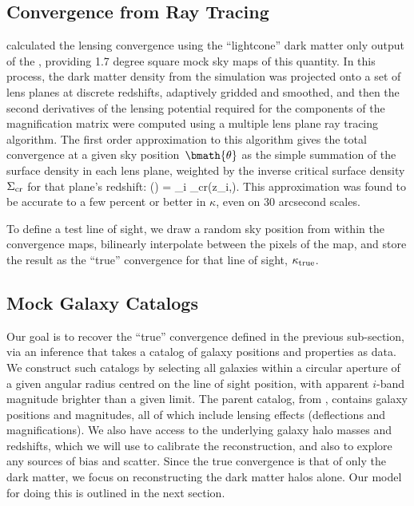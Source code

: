 \documentclass[useAMS,usenatbib]{mn2e}
\begin{document}
\subsection{Convergence from Ray Tracing}
\label{sec:MS:raytracing}

\citet{HilbertEtal2009} calculated the lensing convergence using the
``lightcone'' dark matter only 
output of the \MS, providing 1.7 degree square 
mock sky maps of this
quantity. In this process, the dark matter density from the simulation
was projected onto a set of lens planes at discrete redshifts,
adaptively gridded and smoothed, and then the second derivatives of the 
lensing potential required for the components of the magnification
matrix were computed using a multiple lens plane ray tracing algorithm.
The first order approximation to this algorithm \citep[equation 17
of][]{HilbertEtal2009} gives the total convergence at a given sky
position~$\bmath{\theta}$ as the simple summation of the surface density
in each lens plane, weighted by the inverse critical surface density
$\Sigma_{\rm cr}$ for that plane's redshift:
\be
\kappa(\bmath{\theta}) = \sum_i 
                                     {\Sigma_{\rm cr}(z_i,\zs)}.
\ee
This approximation was found to be accurate to a few percent or better
in $\kappa$, even on 30 arcsecond scales.

To define a test line of sight, we draw a random sky position from
within the convergence maps, bilinearly interpolate between the pixels
of the map, and store the result as the ``true'' convergence for that
line of sight, $\kappa_{\rm true}$. 



\subsection{Mock Galaxy Catalogs}
\label{sec:MS:mocks}

Our goal is to recover the ``true'' convergence defined in the previous
sub-section, via an inference that takes a catalog of galaxy positions
and properties as data. We construct such catalogs by selecting all \MS
galaxies within a circular aperture of a given angular radius centred on
the line of sight position, with apparent $i$-band magnitude brighter
than a given limit. The parent catalog, from \citet{HilbertEtal2011},
contains galaxy positions and magnitudes, all of which include lensing
effects (deflections and magnifications). We also have access to the
underlying galaxy halo masses and redshifts, which we will use to
calibrate the reconstruction, and also to explore any sources of bias
and scatter. Since the true convergence is that of only the dark matter,
we focus on reconstructing the dark matter halos alone. Our model for
doing this is outlined in the next section. 
\end{document}
